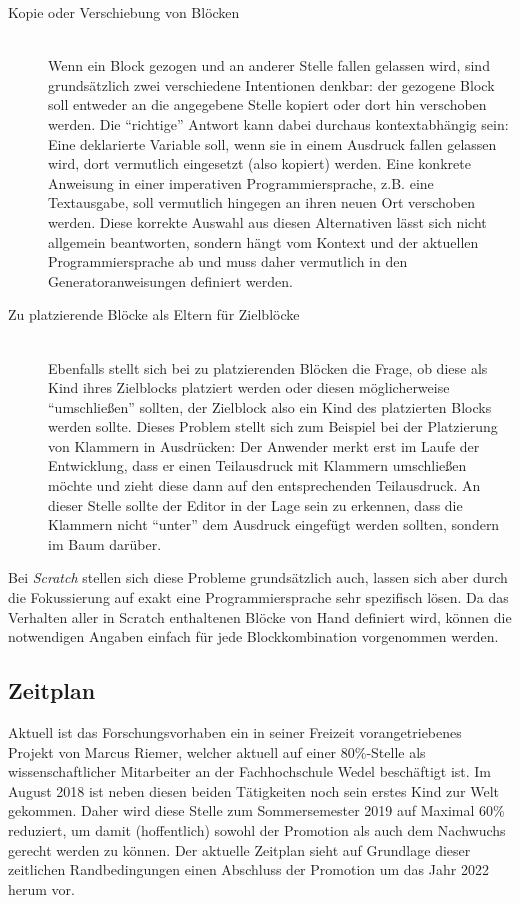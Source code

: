 \documentclass[paper=a4,fontsize=11pt,parskip=half]{scrartcl}
\begin{document}
\begin{description}
\item[Kopie oder Verschiebung von Blöcken] \hfill\\
  Wenn ein Block gezogen und an anderer Stelle fallen gelassen wird, sind grundsätzlich zwei verschiedene Intentionen denkbar: der gezogene Block soll entweder an die angegebene Stelle kopiert oder dort hin verschoben werden. Die \enquote{richtige} Antwort kann dabei durchaus kontextabhängig sein: Eine deklarierte Variable soll, wenn sie in einem Ausdruck fallen gelassen wird, dort vermutlich eingesetzt (also kopiert) werden. Eine konkrete Anweisung in einer imperativen Programmiersprache, z.B. eine Textausgabe, soll vermutlich hingegen an ihren neuen Ort verschoben werden. Diese korrekte Auswahl aus diesen Alternativen lässt sich nicht allgemein beantworten, sondern hängt vom Kontext und der aktuellen Programmiersprache ab und muss daher vermutlich in den Generatoranweisungen definiert werden.
\item[Zu platzierende Blöcke als Eltern für Zielblöcke] \hfill\\
  Ebenfalls stellt sich bei zu platzierenden Blöcken die Frage, ob diese als Kind ihres Zielblocks platziert werden oder diesen möglicherweise \enquote{umschließen} sollten, der Zielblock also ein Kind des platzierten Blocks werden sollte. Dieses Problem stellt sich zum Beispiel bei der Platzierung von Klammern in Ausdrücken: Der Anwender merkt erst im Laufe der Entwicklung, dass er einen Teilausdruck mit Klammern umschließen möchte und zieht diese dann auf den entsprechenden Teilausdruck. An dieser Stelle sollte der Editor in der Lage sein zu erkennen, dass die Klammern nicht \enquote{unter} dem Ausdruck eingefügt werden sollten, sondern im Baum darüber.
\end{description}

Bei \textit{Scratch} stellen sich diese Probleme grundsätzlich auch, lassen sich aber durch die Fokussierung auf exakt eine Programmiersprache sehr spezifisch lösen. Da das Verhalten aller in Scratch enthaltenen Blöcke von Hand definiert wird, können die notwendigen Angaben einfach für jede Blockkombination vorgenommen werden.

\subsection{Zeitplan}

Aktuell ist das Forschungsvorhaben ein in seiner Freizeit vorangetriebenes Projekt von Marcus Riemer, welcher aktuell auf einer 80\%-Stelle als wissenschaftlicher Mitarbeiter an der Fachhochschule Wedel beschäftigt ist. Im August 2018 ist neben diesen beiden Tätigkeiten noch sein erstes Kind zur Welt gekommen. Daher wird diese Stelle zum Sommersemester 2019 auf Maximal 60\% reduziert, um damit (hoffentlich) sowohl der Promotion als auch dem Nachwuchs gerecht werden zu können. Der aktuelle Zeitplan sieht auf Grundlage dieser zeitlichen Randbedingungen einen Abschluss der Promotion um das Jahr 2022 herum vor.
\end{document}
